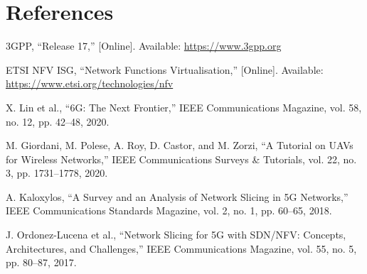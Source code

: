 \documentclass[a4paper,12pt]{article}
\begin{document}
\section*{References}
\begin{enumerate}[label={[\arabic*]}]
    \item 3GPP, “Release 17,” [Online]. Available: \url{https://www.3gpp.org}
    \item ETSI NFV ISG, “Network Functions Virtualisation,” [Online]. Available: \url{https://www.etsi.org/technologies/nfv}
    \item X. Lin et al., “6G: The Next Frontier,” IEEE Communications Magazine, vol. 58, no. 12, pp. 42–48, 2020.
    \item M. Giordani, M. Polese, A. Roy, D. Castor, and M. Zorzi, “A Tutorial on UAVs for Wireless Networks,” IEEE Communications Surveys \& Tutorials, vol. 22, no. 3, pp. 1731–1778, 2020.
    \item A. Kaloxylos, “A Survey and an Analysis of Network Slicing in 5G Networks,” IEEE Communications Standards Magazine, vol. 2, no. 1, pp. 60–65, 2018.
    \item J. Ordonez-Lucena et al., “Network Slicing for 5G with SDN/NFV: Concepts, Architectures, and Challenges,” IEEE Communications Magazine, vol. 55, no. 5, pp. 80–87, 2017.
\end{enumerate}
\end{document}
